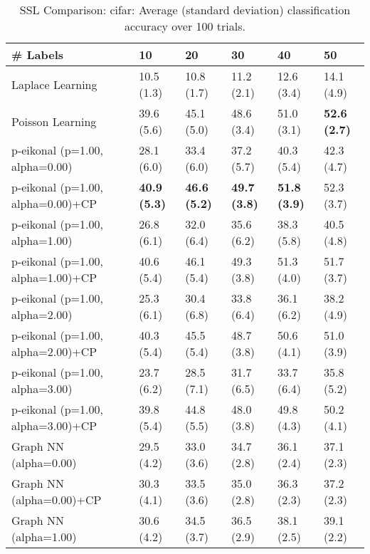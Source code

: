 \documentclass{article}
\begin{document}
\begin{table*}[t!]
\vspace{-3mm}
\caption{SSL Comparison: cifar: Average (standard deviation) classification accuracy over 100 trials.}
\vspace{-3mm}
\label{tab:SSL Comparison: cifar}
\vskip 0.15in
\begin{center}
\begin{small}
\begin{sc}
\begin{tabular}{llllll}
\toprule
\# Labels&\textbf{10}&\textbf{20}&\textbf{30}&\textbf{40}&\textbf{50}\\
\midrule
Laplace Learning&10.5 (1.3)      &10.8 (1.7)      &11.2 (2.1)      &12.6 (3.4)      &14.1 (4.9)      \\
Poisson Learning&39.6 (5.6)      &45.1 (5.0)      &48.6 (3.4)      &51.0 (3.1)      &{\bf 52.6 (2.7)}\\
p-eikonal (p=1.00, alpha=0.00)&28.1 (6.0)      &33.4 (6.0)      &37.2 (5.7)      &40.3 (5.4)      &42.3 (4.7)      \\
p-eikonal (p=1.00, alpha=0.00)+CP&{\bf 40.9 (5.3)}&{\bf 46.6 (5.2)}&{\bf 49.7 (3.8)}&{\bf 51.8 (3.9)}&52.3 (3.7)      \\
p-eikonal (p=1.00, alpha=1.00)&26.8 (6.1)      &32.0 (6.4)      &35.6 (6.2)      &38.3 (5.8)      &40.5 (4.8)      \\
p-eikonal (p=1.00, alpha=1.00)+CP&40.6 (5.4)      &46.1 (5.4)      &49.3 (3.8)      &51.3 (4.0)      &51.7 (3.7)      \\
p-eikonal (p=1.00, alpha=2.00)&25.3 (6.1)      &30.4 (6.8)      &33.8 (6.4)      &36.1 (6.2)      &38.2 (4.9)      \\
p-eikonal (p=1.00, alpha=2.00)+CP&40.3 (5.4)      &45.5 (5.4)      &48.7 (3.8)      &50.6 (4.1)      &51.0 (3.9)      \\
p-eikonal (p=1.00, alpha=3.00)&23.7 (6.2)      &28.5 (7.1)      &31.7 (6.5)      &33.7 (6.4)      &35.8 (5.2)      \\
p-eikonal (p=1.00, alpha=3.00)+CP&39.8 (5.4)      &44.8 (5.5)      &48.0 (3.8)      &49.8 (4.3)      &50.2 (4.1)      \\
Graph NN (alpha=0.00)&29.5 (4.2)      &33.0 (3.6)      &34.7 (2.8)      &36.1 (2.4)      &37.1 (2.3)      \\
Graph NN (alpha=0.00)+CP&30.3 (4.1)      &33.5 (3.6)      &35.0 (2.8)      &36.3 (2.3)      &37.2 (2.3)      \\
Graph NN (alpha=1.00)&30.6 (4.2)      &34.5 (3.7)      &36.5 (2.9)      &38.1 (2.5)      &39.1 (2.2)      \\

\end{tabular}
\end{sc}
\end{small}
\end{center}
\end{table*}
\end{document}

